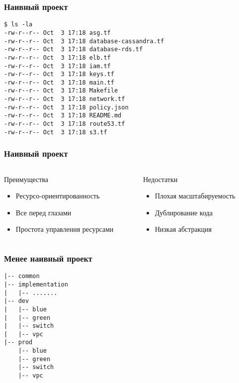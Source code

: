 \documentclass[mathserif,serif]{beamer}
\begin{document}
\begin{frame}[fragile]
	\frametitle{Наивный проект}
	\begin{verbatim}
$ ls -la
-rw-r--r-- Oct  3 17:18 asg.tf
-rw-r--r-- Oct  3 17:18 database-cassandra.tf
-rw-r--r-- Oct  3 17:18 database-rds.tf
-rw-r--r-- Oct  3 17:18 elb.tf
-rw-r--r-- Oct  3 17:18 iam.tf
-rw-r--r-- Oct  3 17:18 keys.tf
-rw-r--r-- Oct  3 17:18 main.tf
-rw-r--r-- Oct  3 17:18 Makefile
-rw-r--r-- Oct  3 17:18 network.tf
-rw-r--r-- Oct  3 17:18 policy.json
-rw-r--r-- Oct  3 17:18 README.md
-rw-r--r-- Oct  3 17:18 route53.tf
-rw-r--r-- Oct  3 17:18 s3.tf
	\end{verbatim}
\end{frame}

\begin{frame}
	\frametitle{Наивный проект}
	\begin{columns}[T]
		\begin{column}{.5\linewidth}
			\begin{minipage}[c][\textheight][c]{\linewidth}
          			Преимущества
				\begin{itemize}
					\item{Ресурсо-ориентированность}
					\item{Все перед глазами}
					\item{Простота управления ресурсами}
				\end{itemize}
			\end{minipage}
		\end{column}
		\begin{column}{.5\linewidth}
			\begin{minipage}[c][\textheight][c]{\linewidth}
          			Недостатки
				\begin{itemize}
					\item{Плохая масштабируемость}
					\item{Дублирование кода}
					\item{Низкая абстракция}
				\end{itemize}
			\end{minipage}
		\end{column}
	\end{columns}
\end{frame}

\begin{frame}[fragile]
	\frametitle{Менее наивный проект}
	\begin{verbatim}
|-- common
|-- implementation
|   |-- .......
|-- dev
|   |-- blue
|   |-- green
|   |-- switch
|   |-- vpc
|-- prod
    |-- blue
    |-- green
    |-- switch
    |-- vpc
	\end{verbatim}
\end{frame}
\end{document}
